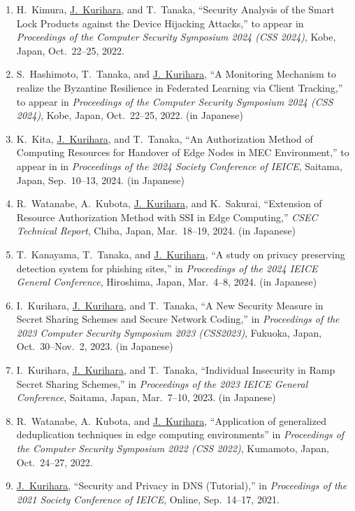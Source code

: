 \begin{enumerate}
 \item H.~Kimura, \underline{J.~Kurihara}, and T.~Tanaka, ``Security Analysis of the Smart Lock Products against the Device Hijacking Attacks,'' to appear in \textit{Proceedings of the Computer Security Symposium 2024 (CSS 2024)}, Kobe, Japan, Oct.~22--25, 2022.
 \item S.~Hashimoto, T.~Tanaka, and \underline{J.~Kurihara}, ``A Monitoring Mechanism to realize the Byzantine Resilience in Federated Learning via Client Tracking,'' to appear in \textit{Proceedings of the Computer Security Symposium 2024 (CSS 2024)}, Kobe, Japan, Oct.~22--25, 2022. (in Japanese)
 \item K.~Kita, \underline{J.~Kurihara}, and T.~Tanaka, ``An Authorization Method of Computing Resources for Handover of Edge Nodes in MEC Environment,'' to appear in in \textit{Proceedings of the 2024 Society Conference of IEICE}, Saitama, Japan, Sep.~10--13, 2024. (in Japanese)
 \item R.~Watanabe, A.~Kubota, \underline{J.~Kurihara}, and K.~Sakurai, ``Extension of Resource Authorization Method with SSI in Edge Computing,'' \textit{CSEC Technical Report}, Chiba, Japan, Mar.~18--19, 2024. (in Japanese)
 \item T.~Kanayama, T.~Tanaka, and \underline{J.~Kurihara}, ``A study on privacy preserving detection system for phishing sites,'' in \textit{Proceedings of the 2024 IEICE General Conference},
       Hiroshima, Japan, Mar.~4--8, 2024. (in Japanese)
 \item I.~Kurihara, \underline{J.~Kurihara}, and T.~Tanaka,
       ``A New Security Measure in Secret Sharing Schemes and Secure Network Coding,''
       in \textit{Proceedings of the 2023 Computer Security Symposium 2023 (CSS2023)},
       Fukuoka, Japan, Oct.~30--Nov.~2, 2023. (in Japanese)
 \item I.~Kurihara, \underline{J.~Kurihara}, and T.~Tanaka,
       ``Individual Insecurity in Ramp Secret Sharing Schemes,''
       in \textit{Proceedings of the 2023 IEICE General Conference},
       Saitama, Japan, Mar.~7--10, 2023. (in Japanese)
 \item R.~Watanabe, A.~Kubota, and \underline{J.~Kurihara}, ``Application of generalized deduplication techniques in edge computing environments'' in \textit{Proceedings of the Computer Security Symposium 2022 (CSS 2022)}, Kumamoto, Japan, Oct.~24--27, 2022.
 \item \underline{J.~Kurihara}, ``Security and Privacy in DNS (Tutorial),'' in \textit{Proceedings of the 2021 Society Conference of IEICE}, Online, Sep.~14--17, 2021.

\end{enumerate}
